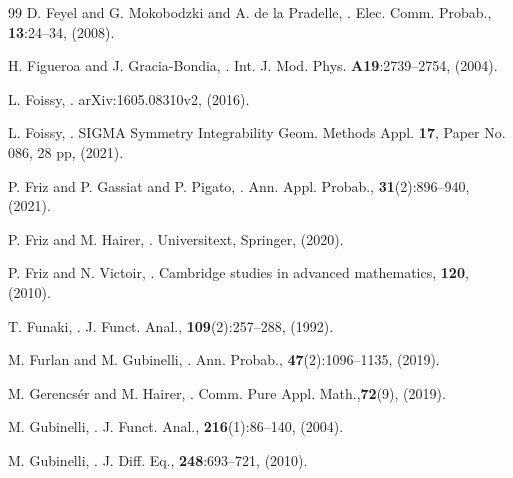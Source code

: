 \documentclass[10pt, reqno]{amsart}
\numberwithin{subsection}{section}
\numberwithin{subsubsection}{subsection}
\numberwithin{equation}{section} %
\theoremstyle{mystyle}
\theoremstyle{mystyle2}
\theoremstyle{mystyle3}
\begin{document}
\begin{thebibliography}{99}
D. Feyel and G. Mokobodzki and A. de la Pradelle, 
.
\newblock Elec. Comm. Probab., {\bf 13}:24--34, (2008). 

H. Figueroa and J. Gracia-Bondia,
.
\newblock Int. J. Mod. Phys. {\bf A19}:2739--2754, (2004).

L. Foissy,
.
\newblock arXiv:1605.08310v2, (2016).

L. Foissy,
.
\newblock SIGMA Symmetry Integrability Geom. Methods Appl. {\bf 17}, Paper No. 086, 28 pp, (2021).

P. Friz and P. Gassiat and P. Pigato,
.
\newblock Ann. Appl. Probab., {\bf 31}(2):896--940, (2021).

P. Friz and M. Hairer,
.
\newblock Universitext, Springer, (2020).

P. Friz and N. Victoir,
.
\newblock Cambridge studies in advanced mathematics, {\bf 120}, (2010).

T. Funaki,
.
\newblock J. Funct. Anal., {\bf 109}(2):257--288, (1992).

M. Furlan and M. Gubinelli,
.
\newblock Ann. Probab., {\bf 47}(2):1096--1135, (2019).

M. Gerencs\'er and M. Hairer,
.
\newblock Comm. Pure Appl. Math.,{\bf 72}(9), (2019).

M. Gubinelli,
.
\newblock J. Funct. Anal., {\bf 216}(1):86--140, (2004).

M. Gubinelli,
.
\newblock J. Diff. Eq., {\bf 248}:693--721, (2010).


\end{thebibliography}
\end{document}

